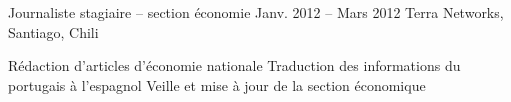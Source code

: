\begin{joblist}
{		%
	}
  
\vspace{-0.2cm}    
\item[Journaliste stagiaire – section économie]{Janv. 2012 -- Mars 2012}     
	{Terra Networks, Santiago, Chili}   
	{
	      \vspace{-0.5cm}			
	      \setlength{\parskip}{-10pt}
	      \begin{itemize}
		    \setlength\itemsep{-3pt} 
		    \cvitem[\checkmark] Rédaction d'articles d’économie nationale 
		    \cvitem[\checkmark] Traduction des informations du portugais à l'espagnol
		    \cvitem[\checkmark] Veille et mise à jour de la section économique
	      \end{itemize}        

       }
   


   

\end{joblist}


%
%


